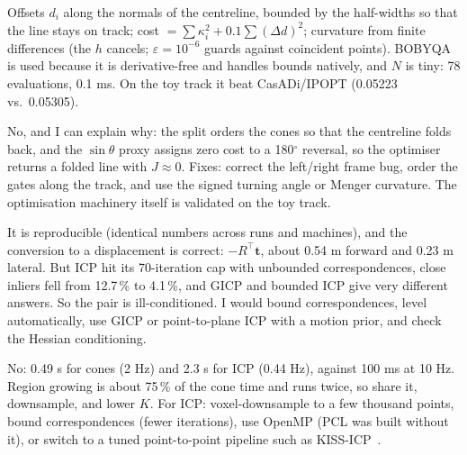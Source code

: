 \documentclass[10pt,a4paper]{scrartcl}
\begin{document}
  \begin{askbox}
  \small Offsets $d_i$ along the normals of the centreline, bounded by the half-widths
  so that the line stays on track; cost $=\sum\kappa_i^2+0.1\sum(\Delta d)^2$; curvature
  from finite differences (the $h$ cancels; $\varepsilon=10^{-6}$ guards against
  coincident points). BOBYQA is used because it is derivative-free and handles bounds
  natively, and $N$ is tiny: 78 evaluations, 0.1 ms. On the toy track it beat
  CasADi/IPOPT (0.05223 vs.\ 0.05305).
  \end{askbox}

  \begin{askbox}
  \small No, and I can explain why: the split orders the cones so that the centreline
  folds back, and the $\sin\theta$ proxy assigns zero cost to a 180$^\circ$ reversal,
  so the optimiser returns a folded line with $J\approx0$. Fixes: correct the
  left/right frame bug, order the gates along the track, and use the signed turning angle
  or Menger curvature. The optimisation machinery itself is validated on the toy track.
  \end{askbox}

  \begin{askbox}
  \small It is reproducible (identical numbers across runs and machines), and the
  conversion to a displacement is correct: $-R^\top\bm t$, about 0.54 m forward and 0.23 m
  lateral. But ICP hit its 70-iteration cap with unbounded correspondences, close inliers
  fell from 12.7\,\% to 4.1\,\%, and GICP and bounded ICP give very different answers.
  So the pair is ill-conditioned. I would bound correspondences, level automatically,
  use GICP or point-to-plane ICP with a motion prior, and check the Hessian
  conditioning.
  \end{askbox}

  \begin{askbox}
  \small No: 0.49 s for cones (2 Hz) and 2.3 s for ICP (0.44 Hz), against 100 ms at
  10 Hz. Region growing is about 75\,\% of the cone time and runs twice, so share it,
  downsample, and lower $K$. For ICP: voxel-downsample to a few thousand points, bound
  correspondences (fewer iterations), use OpenMP (PCL was built without it), or switch
  to a tuned point-to-point pipeline such as KISS-ICP~\citep{vizzo2023kiss}.
  \end{askbox}
\end{document}

